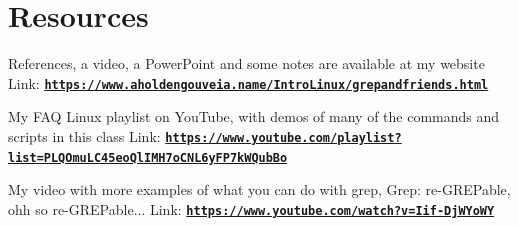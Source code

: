 \documentclass[12pt]{article}
\begin{document}
\section*{Resources}
References, a video, a PowerPoint and some notes are available at my website
Link: \href{https://www.aholdengouveia.name/IntroLinux/grepandfriends.html}{\textbf{\nolinkurl{https://www.aholdengouveia.name/IntroLinux/grepandfriends.html}}}

My FAQ Linux playlist on YouTube, with demos of many of the commands and scripts in this class
Link: \href{https://www.youtube.com/playlist?list=PLQOmuLC45eoQlIMH7oCNL6yFP7kWQubBo}{\textbf{\nolinkurl{https://www.youtube.com/playlist?list=PLQOmuLC45eoQlIMH7oCNL6yFP7kWQubBo}}}

My video with more examples of what you can do with grep, Grep: re-GREPable, ohh so re-GREPable...
Link: \href{https://www.youtube.com/watch?v=Iif-DjWYoWY}{\textbf{\nolinkurl{https://www.youtube.com/watch?v=Iif-DjWYoWY}}}
\end{document}
